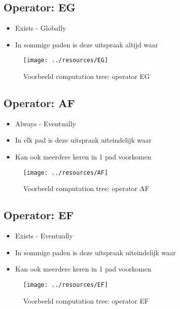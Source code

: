\documentclass{article}
\begin{document}
  \subsection{Operator: EG}
    \begin{itemize}
      \item Exists - Globally
      \item In sommige paden is deze uitspraak altijd waar
    \end{itemize}
    \begin{figure}[h]
      \centering
      \texttt{[image: ../resources/EG]}
      \caption{Voorbeeld computation tree: operator EG}
      \label{fig:eg}
    \end{figure}

  \subsection{Operator: AF}
    \begin{itemize}
      \item Always - Eventually
      \item In elk pad is deze uitspraak uiteindelijk waar
      \item Kan ook meerdere keren in 1 pad voorkomen
    \end{itemize}
    \begin{figure}[h]
      \centering
      \texttt{[image: ../resources/AF]}
      \caption{Voorbeeld computation tree: operator AF}
      \label{fig:af}
    \end{figure}


  \subsection{Operator: EF}
    \begin{itemize}
      \item Exists - Eventually
      \item In sommige paden is deze uitspraak uiteindelijk waar
      \item Kan ook meerdere keren in 1 pad voorkomen
    \end{itemize}
    \begin{figure}[h]
      \centering
      \texttt{[image: ../resources/EF]}
      \caption{Voorbeeld computation tree: operator EF}
      \label{fig:ef}
    \end{figure}
\end{document}
